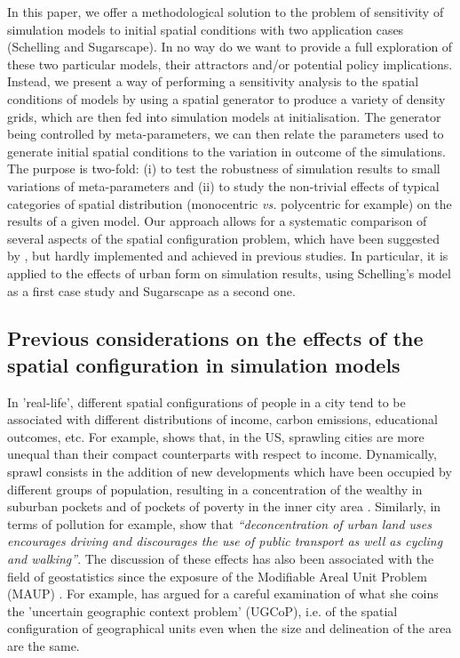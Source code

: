 \documentclass[preprint,5p,times,twocolumn,authoryear]{elsarticle}
\begin{document}
In this paper, we offer a methodological solution to the problem of sensitivity of simulation models to initial spatial conditions with two application cases (Schelling and Sugarscape). In no way do we want to provide a full exploration of these two particular models, their attractors and/or potential policy implications. Instead, we present a way of performing a sensitivity analysis to the spatial conditions of models by using a spatial generator to produce a variety of density grids, which are then fed into simulation models at initialisation. The generator being controlled by meta-parameters, we can then relate the parameters used to generate initial spatial conditions to the variation in outcome of the simulations. The purpose is two-fold: (i) to test the robustness of simulation results to small variations of meta-parameters and (ii) to study the non-trivial effects of typical categories of spatial distribution (monocentric \textit{vs.} polycentric for example) on the results of a given model. Our approach allows for a systematic comparison of several aspects of the spatial configuration problem, which have been suggested by \citet{filatova2013spatial}, but hardly implemented and achieved in previous studies. In particular, it is applied to the effects of urban form on simulation results, using Schelling's model as a first case study and Sugarscape as a second one. 

\subsection{Previous considerations on the effects of the spatial configuration in simulation models}



In 'real-life', different spatial configurations of people in a city tend to be associated with different distributions of income, carbon emissions, educational outcomes, etc. For example, \citet{wheeler2006urban} shows that, in the US, sprawling cities are more unequal than their compact counterparts with respect to income. Dynamically, sprawl consists in the addition of new developments which have been occupied by different groups of population, resulting in a concentration of the wealthy in suburban pockets and of pockets of poverty in the inner city area \citep{jargowsky2002sprawl}. Similarly, in terms of pollution for example, \citet[p.173]{schwanen2001travel} show that \textit{``deconcentration of urban land uses encourages driving and discourages the use of public transport as well as cycling and walking''}. The discussion of these effects has also been associated with the field of geostatistics since the exposure of the Modifiable Areal Unit Problem (MAUP) \citep{Openshaw1984, FotheringhamWong1991}. For example, \citet{Kwan2012} has argued for a careful examination of what she coins the 'uncertain geographic context problem' (UGCoP), i.e. of the spatial configuration of geographical units even when the size and delineation of the area are the same.\\
\end{document}
